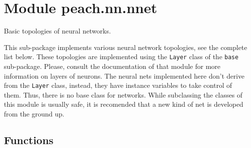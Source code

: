 %
%
%


\section{Module peach.nn.nnet}

    \label{peach:nn:nnet}

Basic topologies of neural networks.

This sub-package implements various neural network topologies, see the complete
list below. These topologies are implemented using the \texttt{Layer} class of the
\texttt{base} sub-package. Please, consult the documentation of that module for more
information on layers of neurons. The neural nets implemented here don't derive
from the \texttt{Layer} class, instead, they have instance variables to take control
of them. Thus, there is no base class for networks. While subclassing the
classes of this module is usually safe, it is recomended that a new kind of
net is developed from the ground up.


  \subsection{Functions}

    \label{peach:nn:rbfn:randn}

    \vspace{0.5ex}

